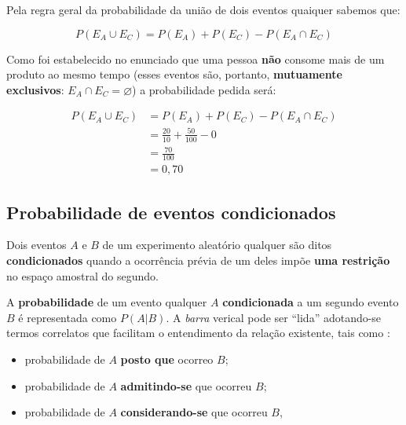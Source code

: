\documentclass[
]{book}
\providecommand{\tightlist}{%
  \setlength{\itemsep}{0pt}\setlength{\parskip}{0pt}}
\begin{document}
\hfill\break

Pela regra geral da probabilidade da união de dois eventos quaiquer sabemos que:

\hfill\break

\[
P(E_{A} \cup E_{C}) = P(E_{A}) + P(E_{C}) - P(E_{A} \cap E_{C})
\]

\hfill\break

Como foi estabelecido no enunciado que uma pessoa \textbf{não} consome mais de um produto ao mesmo tempo (esses eventos são, portanto, \textbf{mutuamente exclusivos}: \(E_{A} \cap E_{C}=\varnothing\)) a probabilidade pedida será:

\hfill\break

\begin{align*}
P(E_{A} \cup E_{C}) & = P(E_{A}) + P(E_{C}) - P(E_{A} \cap E_{C}) \\
                    & = \frac{20}{10} + \frac{50}{100} - 0 \\
                    & =  \frac{70}{100} \\
                    & =  0,70    
\end{align*}

\hfill\break

\hypertarget{probabilidade-de-eventos-condicionados}{%
\subsection{Probabilidade de eventos condicionados}\label{probabilidade-de-eventos-condicionados}}

Dois eventos \(A\) e \(B\) de um experimento aleatório qualquer são ditos \textbf{condicionados} quando a ocorrência prévia de um deles impõe \textbf{uma restrição} no espaço amostral do segundo.

\hfill\break

A \textbf{probabilidade} de um evento qualquer \(A\) \textbf{condicionada} a um segundo evento \(B\) é representada como \(P(A|B)\). A \emph{barra} verical pode ser ``lida'' adotando-se termos correlatos que facilitam o entendimento da relação existente, tais como :

\hfill\break

\begin{itemize}
\tightlist
\item
  probabilidade de \(A\) \textbf{posto que} ocorreo \(B\);
\item
  probabilidade de \(A\) \textbf{admitindo-se} que ocorreu \(B\);
\item
  probabilidade de \(A\) \textbf{considerando-se} que ocorreu \(B\),
\end{itemize}
\end{document}
